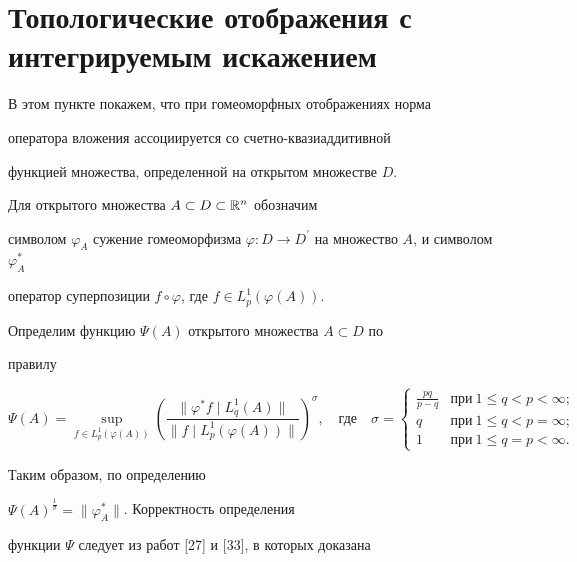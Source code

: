 \section{Топологические отображения с интегрируемым искажением}





В этом пункте покажем, что при гомеоморфных отображениях норма


оператора вложения ассоциируется со счетно-квазиаддитивной


функцией множества, определенной на открытом множестве $D$.





Для открытого множества $A\subset D\subset{\Bbb R}^n$ обозначим


символом $\varphi_A$ сужение гомеоморфизма $\varphi :


D\to D^{\prime}$ на множество $A$, и символом $\varphi_A^{*}$


оператор суперпозиции $f\circ\varphi$, где $f\in


L^1_p(\varphi(A))$.





Определим функцию $\Psi(A)$ открытого множества $A\subset D$ по


правилу


$$


\Psi(A)=\sup_{f\in {L}_{p}^{1}(\varphi(A))}


\left( \frac{\|\varphi^{\ast} f\mid {L}_{q}^{1}(A)\|}


{\|f\mid {L}_{p}^{1}(\varphi(A))\|}


\right)^{\sigma},\quad \text{где}\quad \sigma=


\begin{cases}


\frac{pq}{p-q} & \text{при}\ 1\leq q<p<\infty;\\


q & \text{при}\ 1\leq q< p=\infty;\\


1 & \text{при}\ 1\leq q =p<\infty.


\end{cases}


$$


Таким образом, по определению


$\Psi(A)^{\frac{1}{\sigma}}=\|\varphi^*_A\|$. Корректность определения


функции $\Psi$ следует из работ [27] и [33], в которых доказана


